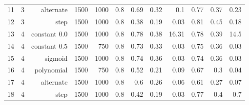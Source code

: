 \begin{table}[!h]
{\begin{tabular}{rrrrrrrrrrrr}
    			11  & 3       & alternate  & 1500       & 1000            & 0.8 & 0.69  & 0.32 & 0.1    & 0.77  & 0.37 & 0.23   \\
          12 & 3 & step     & 1500 &  1000 &  0.8 &    0.38 &   0.19 &     0.03 &    0.81 &   0.45 &     0.18 \\
    			\hline
          13  & 4       & constant 0.0   & 1500       &  1000           & 0.8  &    0.78 &   0.38 &    16.31 &    0.78 &   0.39 &    14.5 \\
    			14 & 4       & constant 0.5   & 1500       & 750             & 0.8 & 0.73  & 0.33 & 0.03   & 0.75  & 0.36 & 0.03   \\
    			15 & 4       & sigmoid    & 1500       & 1000            & 0.8 & 0.74  & 0.36 & 0.03   & 0.74  & 0.36 & 0.03   \\
    			16 & 4       & polynomial & 1500       & 750             & 0.8 & 0.52  & 0.21 & 0.09   & 0.67  & 0.3  & 0.04   \\
    			17 & 4       & alternate  & 1500       & 1000            & 0.8 & 0.6   & 0.26 & 0.06   & 0.61  & 0.27 & 0.07   \\
          18 & 4       & step       & 1500       &  1000           & 0.8  &    0.42 &   0.19 &     0.03 &    0.77 &   0.4  &     0.7 \\


    			\hline
    		\end{tabular}  } \caption{} \label{tab:pseaafasfrch} \end{table}


    \newpage

    \newpage
